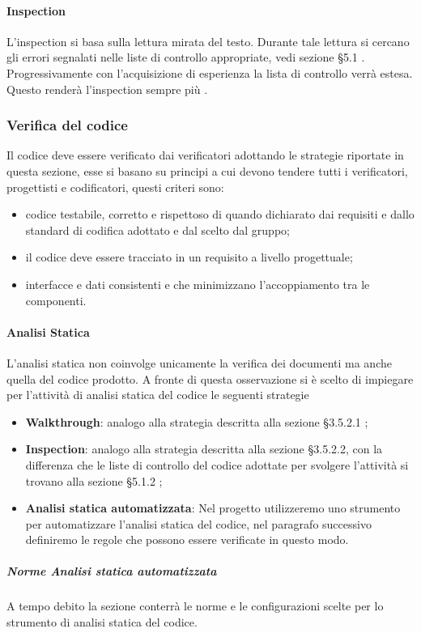             \paragraph{Inspection}
                L’inspection si basa sulla lettura mirata del testo. Durante tale lettura si cercano gli errori segnalati nelle liste di controllo appropriate, vedi sezione §5.1 . Progressivamente con l’acquisizione di esperienza la lista di controllo verrà estesa. Questo renderà l’inspection sempre più .

        \subsubsection{Verifica del codice}
            Il codice deve essere verificato dai verificatori adottando le strategie riportate in questa sezione, esse si basano su principi a cui devono tendere tutti i verificatori, progettisti e codificatori, questi criteri sono:
            \begin{itemize}
                \item  codice testabile, corretto e rispettoso di quando dichiarato dai requisiti e dallo standard di codifica adottato e dal  scelto dal gruppo;
                \item il codice deve essere tracciato in un requisito a livello progettuale; 
                \item interfacce e dati consistenti e che minimizzano l’accoppiamento tra le componenti.
            \end{itemize}
            \paragraph{Analisi Statica}
                L’analisi statica non coinvolge unicamente la verifica dei documenti ma anche quella del codice prodotto. A fronte di questa osservazione si è scelto di impiegare per l’attività di analisi statica del codice le seguenti strategie
                \begin{itemize}
                    \item\textbf{Walkthrough}: analogo alla strategia descritta alla sezione §3.5.2.1 ;
                    \item\textbf{Inspection}: analogo alla strategia descritta alla sezione §3.5.2.2, con la differenza che le liste di controllo del codice adottate per svolgere l’attività si trovano alla sezione §5.1.2 ;
                    \item\textbf{Analisi statica automatizzata}: Nel progetto utilizzeremo uno strumento per automatizzare l'analisi statica del codice, nel paragrafo successivo definiremo le regole che possono essere verificate in questo modo.
                \end{itemize}
                \subparagraph{Norme Analisi statica automatizzata}
                    A tempo debito la sezione conterrà le norme e le configurazioni scelte per lo strumento di analisi statica del codice.
